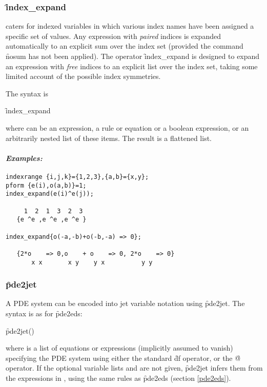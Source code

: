 \subsubsection{\f{index\_expand}}
\label{index_expand}

\hypertarget{operator:INDEX_EXPAND}{}
 caters for indexed variables in which various index names have been
assigned a specific set of values. Any expression with \emph{paired} indices
is expanded automatically to an explicit sum over the index set (provided
the  command \f{nosum} has not been applied). The  operator
\f{index\_expand} is designed to expand an expression with \emph{free}
indices to an explicit list over the index set, taking some limited account
of the possible index symmetries.

The syntax is
\begin{syntax}
	\f{index\_expand} 
\end{syntax}
where  can be an expression, a rule or equation or a boolean
expression, or an arbitrarily nested list of these items. The result is a
flattened list.

\paragraph{\textit{Examples:}}
\begin{verbatim}
indexrange {i,j,k}={1,2,3},{a,b}={x,y};
pform {e(i),o(a,b)}=1;
index_expand(e(i)^e(j));

     1  2  1  3  2  3
   {e ^e ,e ^e ,e ^e }

index_expand{o(-a,-b)+o(-b,-a) => 0};

   {2*o    => 0,o    + o    => 0, 2*o    => 0}
       x x       x y    y x          y y
\end{verbatim}


\subsubsection{\f{pde2jet}}
\label{pde2jet}

\hypertarget{operator:PDE2JET}{}
A PDE system can be encoded into  jet variable notation using
\f{pde2jet}. The syntax is as for \f{pde2eds}:
\begin{syntax}
	\f{pde2jet}()
\end{syntax}
where  is a list of equations or expressions (implicitly assumed
to vanish) specifying the PDE system using either the standard \REDUCE
\f{df} operator, or the  \f{@} operator. If the optional variable
lists  and  are not given, \f{pde2jet}
infers them from the expressions in , using the same rules as
\f{pde2eds} (section \ref{pde2eds}).

